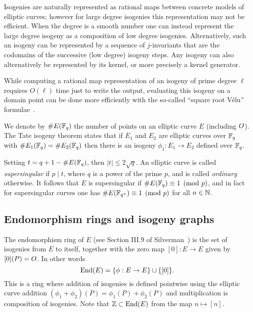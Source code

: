 Isogenies are naturally represented as rational maps between concrete models of elliptic curves; however for large degree isogenies this representation may not be efficient. When the degree is a smooth number one can instead represent the large degree isogeny as a composition of low degree isogenies.
Alternatively, such an isogeny can be represented by a sequence of $j$-invariants that are the codomains of the successive (low degree) isogeny steps. 
%
Any isogeny can also alternatively be represented by its kernel, or more precisely a kernel generator. 
%

While computing a rational map representation of an isogeny of prime degree $\ell$ requires $O(\ell)$ time just to write the output, evaluating this isogeny on a domain point  can be done more efficiently with the so-called ``square root Vélu'' formulae~\cite{velusqrt}. %



We denote by $\# E( \mathbb{F}_q )$ the number of points on an elliptic curve $E$ (including $O$).
The Tate isogeny theorem  states that if $E_1$ and $E_2$ are elliptic curves over $\mathbb{F}_q$ with $\#E_1(\mathbb{F}_q) = \#E_2(\mathbb{F}_q)$ then there is an isogeny $\phi_1 : E_1 \rightarrow E_2$ defined over $\mathbb{F}_q$.


Setting $t = q + 1 - \#E(\mathbb{F}_q )$, then $|t| \le 2 \sqrt{q}$.
An elliptic curve is called \emph{supersingular} if $p \mid t$, where $q$ is a power of the prime $p$, and is called \emph{ordinary} otherwise.
It follows that $E$ is supersingular if $\#E(\mathbb{F}_q ) \equiv 1 \pmod{p} $, and in fact for supersingular curves one has $\#E( \mathbb{F}_{q^n}) \equiv 1 \pmod{p}$ for all $n \in \mathbb{N}$.



\subsection{Endomorphism rings and isogeny graphs}
\label{sec:isog-graph}



The endomorphism ring of $E$ (see Section III.9 of Silverman~\cite{Silverman}) is the set of isogenies  from $E$ to itself, together with the zero map $[0] : E \to E$ given by $[0](P) = O$.
In other words
\[
   \text{End}(E)  = \{ \phi : E \to E \} \cup \{ [0] \}.
\]
This is a ring where addition of isogenies is defined pointwise using the elliptic curve addition $(\phi_1 + \phi_2)(P) = \phi_1(P) + \phi_2(P)$ and multiplication is composition of isogenies.
Note that $\mathbb{Z} \subset \text{End}(E)$ from the map $n \mapsto [n]$.

